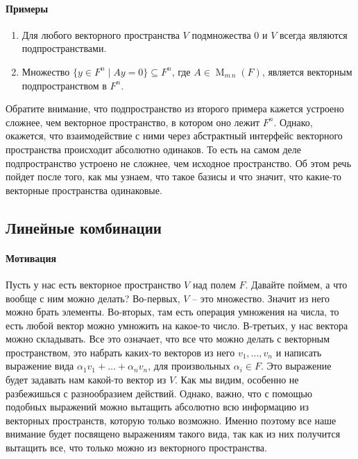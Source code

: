 \paragraph{Примеры}
\begin{enumerate}
\item Для любого векторного пространства $V$ подмножества $0$ и $V$ всегда являются подпространствами.

\item Множество $\{y\in F^n \mid Ay = 0\}\subseteq F^n$, где $A\in\operatorname{M}_{m\,n}(F)$, является векторным подпространством в $F^n$.
\end{enumerate}

Обратите внимание, что подпространство из второго примера кажется устроено сложнее, чем векторное пространство, в котором оно лежит $F^n$.
Однако, окажется, что взаимодействие с ними через абстрактный интерфейс векторного пространства происходит абсолютно одинаков.
То есть на самом деле подпространство устроено не сложнее, чем исходное пространство.
Об этом речь пойдет после того, как мы узнаем, что такое базисы и что значит, что какие-то векторные пространства одинаковые.

\subsection{Линейные комбинации}

\paragraph{Мотивация}
Пусть у нас есть векторное пространство $V$ над полем $F$.
Давайте поймем, а что вообще с ним можно делать?
Во-первых, $V$ -- это множество.
Значит из него можно брать элементы.
Во-вторых, там есть операция умножения на числа, то есть любой вектор можно умножить на какое-то число.
В-третьих, у нас вектора можно складывать.
Все это означает, что все что можно делать с векторным пространством, это набрать каких-то векторов из него $v_1,\ldots,v_n$ и написать выражение вида $\alpha_1 v_1 + \ldots + \alpha_n v_n$, для произвольных $\alpha_i\in F$.
Это выражение будет задавать нам какой-то вектор из $V$.
Как мы видим, особенно не разбежишься с разнообразием действий.
Однако, важно, что с помощью подобных выражений можно вытащить абсолютно всю информацию из векторных пространств, которую только возможно.
Именно поэтому все наше внимание будет посвящено выражениям такого вида, так как из них получится вытащить все, что только можно из векторного пространства.

